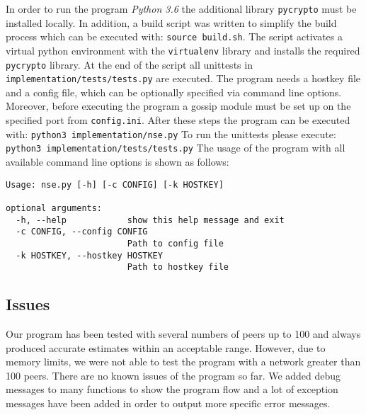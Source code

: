 \documentclass[IN,11pt,oneside,openright,english]{article}
\begin{document}
\newpage
In order to run the program \textit{Python 3.6} the additional library \texttt{pycrypto} must be installed locally. \newline \newline
In addition, a build script was written to simplify the build process which can be executed with: \texttt{source build.sh}.
\newline The script activates a virtual python environment with the \texttt{virtualenv} library and installs the required \texttt{pycrypto} library.
At the end of the script all unittests in \texttt{implementation/tests/tests.py} are executed.
\newline \newline The program needs a hostkey file and a config file, which can be optionally specified via command line options. \newline
Moreover, before executing the program a gossip module must be set up on the specified port from \texttt{config.ini}.
\newline \newline After these steps the program can be executed with: \newline
\texttt{python3 implementation/nse.py}
\newline \newline To run the unittests please execute: \newline
\texttt{python3 implementation/tests/tests.py}
\newline \newline The usage of the program with all available command line options is shown as follows:

\begin{lstlisting}[frame=single]
Usage: nse.py [-h] [-c CONFIG] [-k HOSTKEY]

optional arguments:
  -h, --help            show this help message and exit
  -c CONFIG, --config CONFIG
                        Path to config file
  -k HOSTKEY, --hostkey HOSTKEY
                        Path to hostkey file

\end{lstlisting}

\subsection{Issues}
Our program has been tested with several numbers of peers up to 100 and always produced accurate estimates within an acceptable range. However, due to memory limits, we were not able to test the program with a network greater than 100 peers.
There are no known issues of the program so far. We added debug messages to many functions to show the program flow and a lot of exception messages have been added in order to output more specific error messages.
\end{document}
